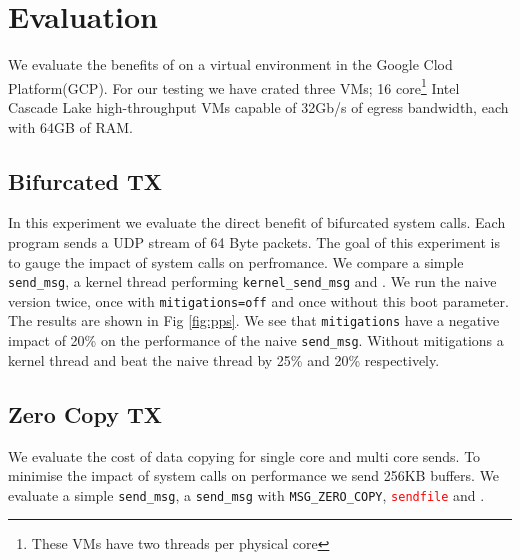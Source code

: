 \section{Evaluation}
We evaluate the benefits of \oursys on a virtual environment in the Google Clod Platform(GCP).
For our testing we have crated three VMs; 16 core\footnote{These VMs have two threads per physical core} Intel Cascade Lake high-throughput VMs capable of 32Gb/s of  egress bandwidth\cite{gcp}, each with 64GB of RAM.

\subsection{Bifurcated TX}\label{sec:eval_bif}
In this experiment we evaluate the direct benefit of bifurcated system calls. Each program sends a UDP stream of 64 Byte packets. The goal of this experiment is to gauge the impact of system calls on perfromance. We compare a simple \texttt{send\_msg}, a kernel thread performing \texttt{kernel\_send\_msg} and \oursys. We run the naive version twice, once with \texttt{mitigations=off}\cite{mitigations} and once without this boot parameter. The results are shown in Fig \ref{fig:pps}. We see that \texttt{mitigations} have a negative impact of 20\% on the performance of the naive \texttt{send\_msg}. Without mitigations a kernel thread and \oursys beat the naive thread by 25\% and 20\% respectively.

\subsection{Zero Copy TX}
We evaluate the cost of data copying for single core and multi core sends. To minimise the impact of system calls on performance we send 256KB buffers. We evaluate a simple \texttt{send\_msg}, a \texttt{send\_msg} with \texttt{MSG\_ZERO\_COPY}, \textcolor{red}{\texttt{sendfile}} and \oursys.


